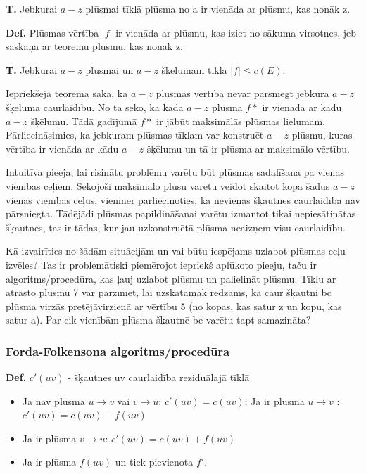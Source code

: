 \documentclass{article}
\begin{document}
\textbf{T. } Jebkurai $a-z$ plūsmai tīklā plūsma no a ir vienāda ar plūsmu, kas nonāk z.

\textbf{Def.} Plūsmas vērtība $|f |$ ir vienāda ar plūsmu, kas iziet no sākuma virsotnes, jeb saskaņā ar teorēmu plūsmu, kas nonāk z.

\textbf{T. }Jebkurai $a-z$ plūsmai un $ a-z$ šķēlumam tīklā $|f | \le c(E )$.

Iepriekšējā teorēma saka, ka $a-z$ plūsmas vērtība nevar pārsniegt jebkura $a-z$ šķēluma caurlaidību. No tā seko, ka kāda $a-z$ plūsma $f*$ ir vienāda ar kādu $a-z$ šķēlumu. Tādā gadījumā $f*$ ir jābūt maksimālās plūsmas lielumam. Pārliecināsimies, ka jebkuram plūsmas tīklam var konstruēt $a-z$ plūsmu, kuras vērtība ir vienāda ar kādu $a-z$ šķēlumu un tā ir plūsma ar maksimālo vērtību.

Intuitīva pieeja, lai risinātu problēmu varētu būt plūsmas sadalīšana pa vienas vienības ceļiem.  Sekojoši maksimālo plūsu varētu veidot skaitot kopā šādus $a-z$ vienas vienības ceļus, vienmēr pārliecinoties, ka nevienas šķautnes caurlaidība nav pārsniegta.  Tādējādi plūsmas papildināšanai varētu izmantot tikai nepiesātinātas šķautnes, tas ir tādas, kur jau uzkonstruētā plūsma neaizņem visu caurlaidību.

Kā izvairīties no šādām situācijām un vai būtu iespējams uzlabot plūsmas ceļu izvēles? Tas ir problemātiski piemērojot iepriekš aplūkoto pieeju, taču ir algoritms/procedūra, kas ļauj uzlabot plūsmu un palielināt plūsmu.  Tīklu ar atrasto plūsmu 7 var pārzīmēt, lai uzskatāmāk redzams, ka caur šķautni bc plūsma virzās pretējāvirzienā ar vērtību 5 (no kopas, kas satur z un kopu, kas satur a).  Par cik vienībām plūsma šķautnē be varētu tapt samazināta?

\subsubsection{Forda-Folkensona algoritms/procedūra}

\textbf{Def.} $c'(uv)$ - šķautnes uv caurlaidība reziduālajā tīklā
\begin{itemize}
	\item Ja nav plūsma $u \to v$ vai $v \to u$: $c' (uv ) = c(uv )$; Ja ir plūsma $u → v$ : $c' (uv ) = c(uv ) − f (uv )$
	\item Ja ir plūsma $v \to u$: $c' (uv ) = c(uv ) + f (uv )$
	\item Ja ir plūsma $f(uv)$ un tiek pievienota $f'$.
\end{itemize}
\end{document}
